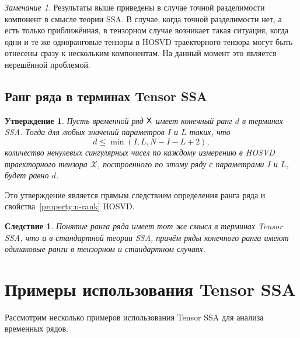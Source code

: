 \documentclass[specialist,
    substylefile = spbu_report.rtx,
    subf,href,colorlinks=true, 12pt]{disser}
\theoremstyle{plain}
\newtheorem{statement}{Утверждение}[section]
\newtheorem{corollary}{Следствие}[statement]
\theoremstyle{definition}
\theoremstyle{remark}
\newtheorem*{remark}{Замечание}
\begin{document}
    \begin{remark}
        Результаты выше приведены в случае точной разделимости компонент в смысле теории SSA\@.
        В случае, когда точной разделимости нет, а есть только приближённая, в тензорном случае возникает такая
        ситуация, когда одни и те же одноранговые тензоры в HOSVD траекторного тензора могут быть отнесены
        сразу к нескольким компонентам.
        На данный момент это является нерешённой проблемой.
    \end{remark}

    \subsection{Ранг ряда в терминах Tensor SSA}\label{subsec:tensor-ssa-rank}
    \begin{statement}
        \label{state:tens-ssa-rank}
        Пусть временной ряд $\mathsf{X}$ имеет конечный ранг $d$ в терминах \emph{SSA}\@.
        Тогда для любых значений параметров $I$ и $L$ таких, что
        \[
            d\leqslant\min(I, L, N-I-L+2),
        \]
        количество ненулевых сингулярных чисел по каждому измерению в \emph{HOSVD} траекторного тензора $\mathcal{X}$,
        построенного по этому ряду с параметрами $I$ и $L$, будет равно $d$.
    \end{statement}
    Это утверждение является прямым следствием определения ранга ряда и свойства~\ref{property:n-rank} HOSVD\@.

    \begin{corollary}
        Понятие ранга ряда имеет тот же смысл в терминах Tensor SSA, что и в стандартной теории SSA, причём ряды конечного ранга
        имеют одинаковые ранги в тензорном и стандартном случаях.
    \end{corollary}


    \section{Примеры использования Tensor SSA}\label{sec:tensor-ssa-examples}
    Рассмотрим несколько примеров использования Tensor SSA для анализа временных рядов.
\end{document}
